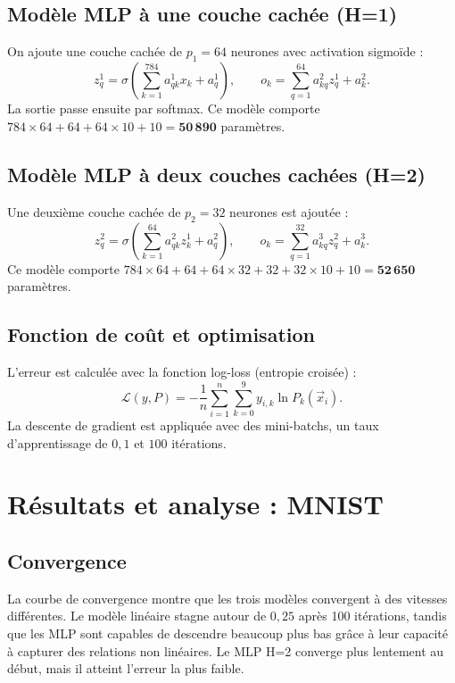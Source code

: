 \documentclass[a4paper,10pt]{article}
\begin{document}
\subsection{Modèle MLP à une couche cachée (H=1)}

On ajoute une couche cachée de $p_1 = 64$ neurones avec activation sigmoïde :
\[
z^1_q = \sigma\!\left(\sum_{k=1}^{784} a^1_{qk} x_k + a^1_q\right), \qquad
o_k = \sum_{q=1}^{64} a^2_{kq} z^1_q + a^2_k.
\]
La sortie passe ensuite par softmax.
Ce modèle comporte
$784 \times 64 + 64 + 64 \times 10 + 10 = \mathbf{50\,890}$ paramètres.

\subsection{Modèle MLP à deux couches cachées (H=2)}

Une deuxième couche cachée de $p_2 = 32$ neurones est ajoutée :
\[
z^2_q = \sigma\!\left(\sum_{k=1}^{64} a^2_{qk} z^1_k + a^2_q\right), \qquad
o_k = \sum_{q=1}^{32} a^3_{kq} z^2_q + a^3_k.
\]
Ce modèle comporte
$784 \times 64 + 64 + 64 \times 32 + 32 + 32 \times 10 + 10 = \mathbf{52\,650}$ paramètres.

\subsection{Fonction de coût et optimisation}

L'erreur est calculée avec la fonction log-loss (entropie croisée) :
\[
\mathcal{L}(y, P) = -\frac{1}{n} \sum_{i=1}^{n} \sum_{k=0}^{9} y_{i,k} \ln P_k(\vec{x}_i).
\]
La descente de gradient est appliquée avec des mini-batchs, un taux
d'apprentissage de $0{,}1$ et $100$ itérations.

\section{Résultats et analyse : MNIST}

\subsection{Convergence}

La courbe de convergence montre que les trois modèles convergent à des vitesses différentes.
Le modèle linéaire stagne autour de $0{,}25$ après 100 itérations, tandis que les MLP
sont capables de descendre beaucoup plus bas grâce à leur capacité à capturer des relations non linéaires.
Le MLP H=2 converge plus lentement au début, mais il atteint l'erreur la plus faible.
\end{document}
